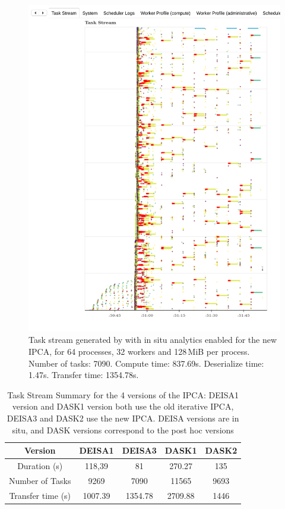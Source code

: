 \begin{figure}[t]\centering
\includegraphics[width=\columnwidth]{figures/P64_W32_D128_DEISA3_IPCA.pdf}
\caption{Task stream generated by \dask with in situ analytics enabled for the new IPCA, for 64 processes, 32 workers and 128\,MiB per process.
    Number of tasks: 7090.
    Compute time: 837.69s.
    Deserialize time: 1.47s.
    Transfer time: 1354.78s.
}
\label{fig:taskstreamdeisa3}
\end{figure}


\begin{table}[ht]\centering
\begin{tabular}{||ccccc||}
\hline
Version               & DEISA1   & DEISA3   & DASK1        & DASK2     \\
\hline\hline
Duration (s)           & 118,39   & 81       & 270.27     &  135       \\
Number of Tasks        & 9269     & 7090     & 11565      &  9693      \\
Transfer time  (s)     & 1007.39  & 1354.78  & 2709.88    &  1446      \\
\hline\hline
\end{tabular}
\caption{\label{tab:taskStrem} Task Stream Summary for the 4 versions of the IPCA: DEISA1 version and DASK1 version both use the old iterative IPCA, DEISA3 and DASK2 use the new IPCA. DEISA versions are in situ, and DASK versions correspond to the post hoc versions}
\end{table}

